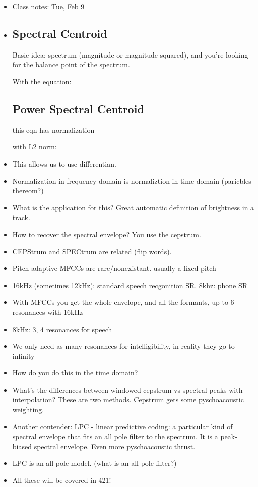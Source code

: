 \begin{itemize}
\item{Class notes: Tue, Feb 9}
\item{\subsection*{Spectral Centroid}}

Basic idea: spectrum (magnitude or magnitude squared), and you're looking for
the balance point of the spectrum.



With the equation:


\subsection*{Power Spectral Centroid}

this eqn has normalization


with L2 norm:


\item{This allows us to use differentian.}

\item{Normalization in frequency domain is normaliztion in time domain (paricbles thereom?)}


\item{What is the application for this? Great automatic definition of brightness in a track.}

\item{How to recover the spectral envelope? You use the cepstrum. }

\item{CEPStrum and SPECtrum are related (flip words).}


\item{Pitch adaptive MFCCs are rare/nonexistant. usually a fixed pitch}
\item{16kHz (sometimes 12kHz): standard speech recgonition SR. 8khz: phone SR}
\item{With MFCCs you get the whole envelope, and all the formants, up to 6 resonances with 16kHz}
\item{8kHz: 3, 4 resonances for speech}
\item{We only need as many resonances for intelligibility, in reality they go to infinity}
\item{How do you do this in the time domain?}
\item{What's the differences between windowed cepstrum vs spectral peaks with interpolation?
These are two methods. Cepstrum gets some pyschoacoustic weighting.}
\item{Another contender: LPC - linear predictive coding: a particular kind of spectral envelope that fits an
all pole filter to the spectrum. It is a peak-biased spectral envelope. Even more pyschoacoustic thrust.}
\item{LPC is an all-pole model. (what is an all-pole filter?)}
\item{All these will be covered in 421!}
\end{itemize}

